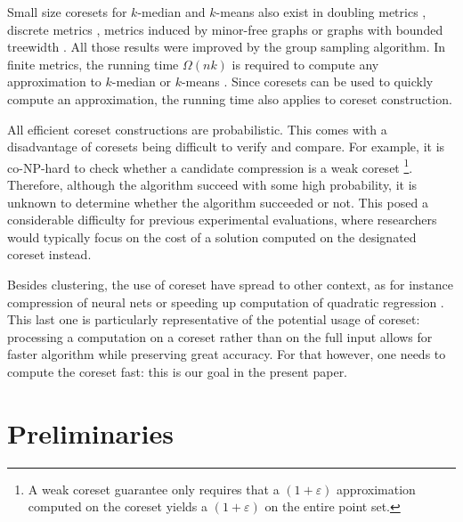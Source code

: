 Small size coresets for $k$-median and $k$-means also exist in doubling metrics \cite{huang2018varepsilon}, discrete metrics \cite{FeldmanL11}, metrics induced by minor-free graphs \cite{BravermanJKW21} or graphs with bounded treewidth \cite{baker2020coresets}. 
All those results were improved by the group sampling algorithm. 
In finite metrics, the running time $\Omega(nk)$ is required to compute any approximation to $k$-median or $k$-means \cite{mettu2004optimal}. Since coresets can be used to quickly compute an approximation, the running time also applies to coreset construction. 


All efficient coreset constructions are probabilistic. This comes with a disadvantage of coresets being difficult to verify and compare. For example, it is co-NP-hard to check whether a candidate compression is a weak coreset \cite{chrisESA} \footnote{A weak coreset guarantee only requires that a $(1+\varepsilon)$ approximation computed on the coreset yields a $(1+\varepsilon)$ on the entire point set.}. Therefore, although the algorithm succeed with some high probability, it is unknown to determine whether the algorithm succeeded or not. 
This posed a considerable difficulty for previous experimental evaluations, where researchers would typically focus on the cost of a solution computed on the designated coreset instead.

Besides clustering, the use of coreset have spread to other context, as for instance compression of neural nets \cite{BaykalLGFR19} or speeding up computation of quadratic regression \cite{MaaloufJF19}.
This last one is particularly representative of the potential usage of coreset: processing a computation on a coreset rather than on the full input allows for faster algorithm while preserving great accuracy.
For that however, one needs to compute the coreset fast: this is our goal in the present paper.

\section{Preliminaries}

